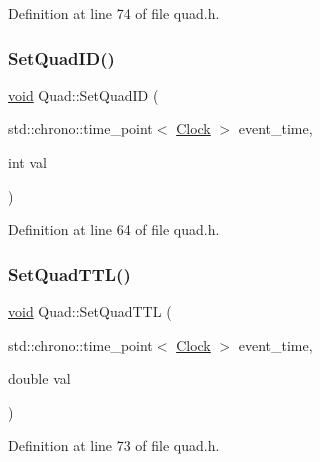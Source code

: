 Definition at line 74 of file quad.\+h.

\mbox{\label{class_quad_a9900acc75445ebc71aba2307e3fe0131}} 
\subsubsection{\texorpdfstring{Set\+Quad\+I\+D()}{SetQuadID()}}
{\footnotesize\ttfamily \mbox{\hyperlink{glad_8h_a950fc91edb4504f62f1c577bf4727c29}{void}} Quad\+::\+Set\+Quad\+ID (\begin{DoxyParamCaption}\item[{std\+::chrono\+::time\+\_\+point$<$ \mbox{\hyperlink{universe_8h_a0ef8d951d1ca5ab3cfaf7ab4c7a6fd80}{Clock}} $>$}]{event\+\_\+time,  }\item[{int}]{val }\end{DoxyParamCaption})\hspace{0.3cm}{\ttfamily [inline]}}



Definition at line 64 of file quad.\+h.

\mbox{\label{class_quad_a4d3a52272d572315198623e836ac0a97}} 
\subsubsection{\texorpdfstring{Set\+Quad\+T\+T\+L()}{SetQuadTTL()}}
{\footnotesize\ttfamily \mbox{\hyperlink{glad_8h_a950fc91edb4504f62f1c577bf4727c29}{void}} Quad\+::\+Set\+Quad\+T\+TL (\begin{DoxyParamCaption}\item[{std\+::chrono\+::time\+\_\+point$<$ \mbox{\hyperlink{universe_8h_a0ef8d951d1ca5ab3cfaf7ab4c7a6fd80}{Clock}} $>$}]{event\+\_\+time,  }\item[{double}]{val }\end{DoxyParamCaption})\hspace{0.3cm}{\ttfamily [inline]}}



Definition at line 73 of file quad.\+h.

\mbox{\label{class_quad_a05fb7c22bfef542b99d04f968b4e18ab}} 
